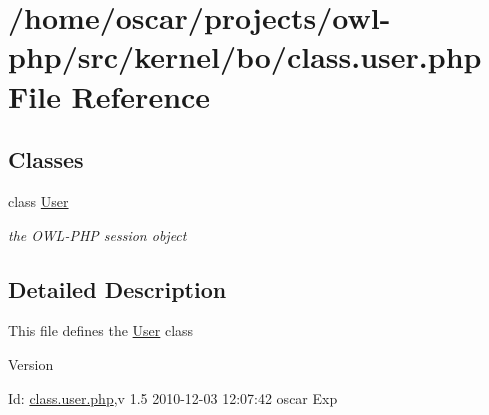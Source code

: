 \section{/home/oscar/projects/owl-\/php/src/kernel/bo/class.user.php File Reference}
\label{class_8user_8php}
\subsection*{Classes}
\begin{DoxyCompactItemize}
\item 
class \hyperlink{classUser}{User}
\begin{DoxyCompactList}\small\item\em the OWL-\/PHP session object \item\end{DoxyCompactList}\end{DoxyCompactItemize}


\subsection{Detailed Description}
This file defines the \hyperlink{classUser}{User} class \begin{DoxyVersion}{Version}

\end{DoxyVersion}
\begin{DoxyParagraph}{Id:}
\hyperlink{class_8user_8php}{class.user.php},v 1.5 2010-\/12-\/03 12:07:42 oscar Exp 
\end{DoxyParagraph}
